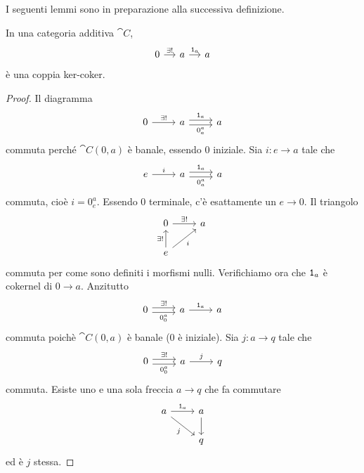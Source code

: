 I seguenti lemmi sono in preparazione alla successiva definizione.

\begin{lemma}\label{lemma:KerCokerId}
  In una categoria additiva \(\cat C \),
  \[
    \begin{tikzcd}[column sep=small]
      0 \ar["{\exists!}", r] & a \ar["{\id_a}", r] & a
    \end{tikzcd}
  \]
  è una coppia ker-coker.
\end{lemma}

\begin{proof}
  Il diagramma
  \[
    \begin{tikzcd}
      0 \ar["{\exists!}", r] & a \ar["{\id_a}", r, shift left]
      \ar["{0_a^a}", r, shift right, swap] & a
    \end{tikzcd}
  \]
  commuta perché \(\cat C(0,a)\) è banale, essendo \(0\) iniziale. Sia
  \(i : e \to a\) tale che
  \[
    \begin{tikzcd}
      e \ar["{i}", r] & a \ar["{\id_a}", r, shift left] \ar["{0_a^a}",
      r, shift right, swap] & a
    \end{tikzcd}
  \]
  commuta, cioè \(i = 0_e^a \). Essendo 0 terminale, c'è esattamente
  un \(e \to 0\). Il triangolo
  \[
    \begin{tikzcd}
      0 \ar["{\exists!}", r] & a \\
      e \ar["{\exists!}", u] \ar["i", ur, swap]
    \end{tikzcd}
  \]
  commuta per come sono definiti i morfismi nulli.  Verifichiamo ora
  che \(\mathtt 1_a\) è cokernel di \(0 \to a\). Anzitutto
  \[
    \begin{tikzcd}
      0 \ar["{\exists!}", r, shift left] \ar["{0_0^a}", r, shift
      right, swap] & a \ar["{\id_a}", r] & a
    \end{tikzcd}
  \]
  commuta poichè \(\cat C(0,a)\) è banale (\(0\) è iniziale). Sia
  \(j:a \to q\) tale che
  \[
    \begin{tikzcd}
      0 \ar["{\exists!}", r, shift left] \ar["{0_0^a}", r, shift
      right, swap] & a \ar["{j}", r] & q
    \end{tikzcd}
  \]
  commuta. Esiste uno e una sola freccia \(a \to q\) che fa commutare
  \[
    \begin{tikzcd}
      a \ar["{\id_a}", r] \ar["j", dr, swap] & a \ar[d] \\
      & q
    \end{tikzcd}
  \]
  ed è \(j\) stessa.
\end{proof}

